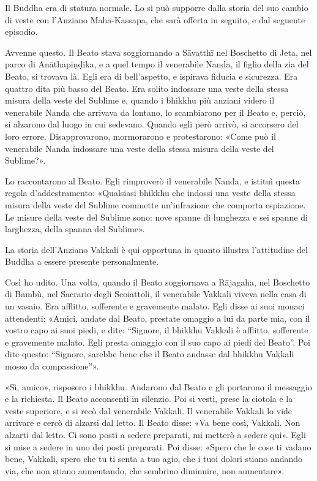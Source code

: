 
 Il Buddha era di statura normale. Lo si può supporre
dalla storia del suo cambio di veste con l’Anziano Mahā-Kassapa, che sarà
offerta in seguito, e dal seguente episodio.

 Avvenne questo. Il Beato stava soggiornando a Sāvatthī nel
Boschetto di Jeta, nel parco di Anāthapiṇḍika, e a quel tempo il venerabile
Nanda, il figlio della zia del Beato, si trovava là. Egli era di bell’aspetto, e
ispirava fiducia e sicurezza. Era quattro dita più basso del Beato. Era solito
indossare una veste della stessa misura della veste del Sublime e, quando i
bhikkhu più anziani videro il venerabile Nanda che arrivava da lontano, lo
scambiarono per il Beato e, perciò, si alzarono dal luogo in cui sedevano.
Quando egli però arrivò, si accorsero del loro errore. Disapprovarono,
mormorarono e protestarono: «Come può il venerabile Nanda indossare una veste
della stessa misura della veste del Sublime?».

Lo raccontarono al Beato. Egli rimproverò il venerabile Nanda, e istituì questa
regola d’addestramento: «Qualsiasi bhikkhu che indossi una veste della stessa
misura della veste del Sublime commette un’infrazione che comporta espiazione.
Le misure della veste del Sublime sono: nove spanne di lunghezza e sei spanne di
larghezza, della spanna del Sublime».


 La storia dell’Anziano Vakkali è qui opportuna in
quanto illustra l’attitudine del Buddha a essere presente personalmente.

 Così ho udito. Una volta, quando il Beato soggiornava a
Rājagaha, nel Boschetto di Bambù, nel Sacrario degli Scoiattoli, il venerabile
Vakkali viveva nella casa di un vasaio. Era afflitto, sofferente e gravemente
malato. Egli disse ai suoi monaci attendenti: «Amici, andate dal Beato, prestate
omaggio a lui da parte mia, con il vostro capo ai suoi piedi, e dite: “Signore,
il bhikkhu Vakkali è afflitto, sofferente e gravemente malato. Egli presta
omaggio con il suo capo ai piedi del Beato”. Poi dite questo: “Signore, sarebbe
bene che il Beato andasse dal bhikkhu Vakkali mosso da compassione”».

«Sì, amico», risposero i bhikkhu. Andarono dal Beato e gli portarono il
messaggio e la richiesta. Il Beato acconsentì in silenzio. Poi si vestì, prese
la ciotola e la veste superiore, e si recò dal venerabile Vakkali. Il venerabile
Vakkali lo vide arrivare e cercò di alzarsi dal letto. Il Beato disse: «Va bene
così, Vakkali. Non alzarti dal letto. Ci sono posti a sedere preparati, mi
metterò a sedere qui». Egli si mise a sedere in uno dei posti preparati. Poi
disse: «Spero che le cose ti vadano bene, Vakkali, spero che tu ti senta a tuo
agio, che i tuoi dolori stiano andando via, che non stiano aumentando, che
sembrino diminuire, non aumentare».

